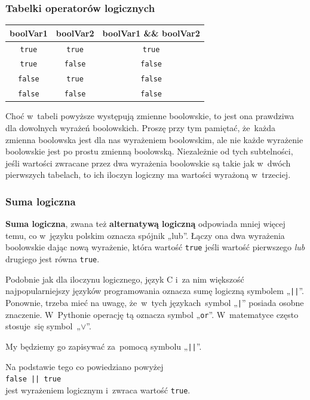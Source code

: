 \documentclass[10pt,t]{beamer}
\begin{document}
\begin{frame}
  \frametitle{Tabelki operatorów logicznych}


  \begingroup

  \centering

  \begin{tabular}{|c|c|c|}
    \hline
    boolVar1 & boolVar2 & boolVar1 \&\& boolVar2 \\
    \hline
    \texttt{true}  & \texttt{true}  & \texttt{true}  \\
    \texttt{true}  & \texttt{false} & \texttt{false} \\
    \texttt{false} & \texttt{true}  & \texttt{false} \\
    \texttt{false} & \texttt{false} & \texttt{false} \\
    \hline
  \end{tabular}

  \endgroup

  \vspace{1em}





  Choć w~tabeli powyższe występują zmienne boolowskie, to jest ona
  prawdziwa dla dowolnych wyrażeń boolowskich. Proszę przy tym pamiętać,
  że~każda zmienna boolowska jest dla nas wyrażeniem boolowskim, ale nie
  każde wyrażenie boolowskie jest po prostu zmienną boolowską. Niezależnie
  od tych subtelności, jeśli wartości zwracane przez dwa wyrażenia
  boolowskie są takie jak w~dwóch pierwszych tabelach, to ich iloczyn
  logiczny ma wartości wyrażoną w~trzeciej.

\end{frame}





\begin{frame}
  \frametitle{Suma logiczna}


  \textbf{Suma logiczna}, zwana też \textbf{alternatywą logiczną} odpowiada
  mniej więcej temu, co w~języku polskim oznacza spójnik „lub”. Łączy ona
  dwa wyrażenia boolowskie dając nową wyrażenie, która wartość \texttt{true}
  jeśli wartość pierwszego \textit{lub} drugiego jest równa \texttt{true}.

  Podobnie jak dla iloczynu logicznego, język C i~za nim większość
  najpopularniejszy języków programowania oznacza sumę logiczną symbolem
  „\texttt{||}”. Ponownie, trzeba mieć na uwagę, że~w~tych językach~symbol
  „\texttt{|}” posiada osobne znaczenie. W~Pythonie operację tą oznacza
  symbol „\texttt{or}”. W~matematyce często stosuje~się symbol~„$\vee$”.

  My będziemy go zapisywać za~pomocą symbolu „\texttt{||}”.

  Na podstawie tego co powiedziano powyżej \\
  \texttt{false || true} \\
  jest wyrażeniem logicznym i~zwraca wartość \texttt{true}.

\end{frame}
\end{document}
